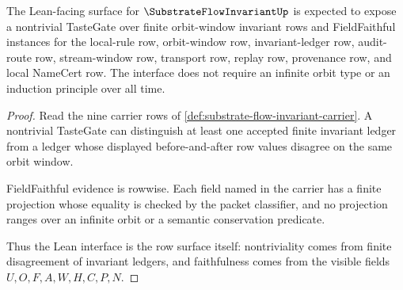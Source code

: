 \begin{theorem}
\label{thm:substrate-flow-invariant-lean-interface}
The Lean-facing surface for $\SubstrateFlowInvariantUp$ is expected to expose a nontrivial TasteGate over finite orbit-window invariant rows and FieldFaithful instances for the local-rule row, orbit-window row, invariant-ledger row, audit-route row, stream-window row, transport row, replay row, provenance row, and local NameCert row. The interface does not require an infinite orbit type or an induction principle over all time.
\end{theorem}
\begin{proof}
Read the nine carrier rows of \autoref{def:substrate-flow-invariant-carrier}. A nontrivial TasteGate can distinguish at least one accepted finite invariant ledger from a ledger whose displayed before-and-after row values disagree on the same orbit window.

FieldFaithful evidence is rowwise. Each field named in the carrier has a finite projection whose equality is checked by the packet classifier, and no projection ranges over an infinite orbit or a semantic conservation predicate.

Thus the Lean interface is the row surface itself: nontriviality comes from finite disagreement of invariant ledgers, and faithfulness comes from the visible fields $U,O,F,A,W,H,C,P,N$.
\end{proof}


\begin{closurestatus}{\SubstrateFlowInvariantUp}
  \theoryclosure{\seedClosure}
  \formalstatus{\unformalizedV}
\end{closurestatus}
